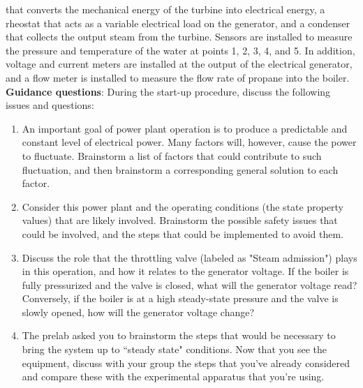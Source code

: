 \documentclass[12pt]{article}
\begin{document}
\noindent that converts the
mechanical energy of the turbine into electrical energy, a rheostat
that acts as a variable electrical load on the generator, and
a condenser that collects the output steam from the turbine.
Sensors are installed to measure the pressure and temperature
of the water at points 1, 2, 3, 4, and 5.  In addition, voltage 
and current meters are installed at the output of the electrical
generator, and a flow meter is installed to measure the 
flow rate of propane into the boiler. \\

\noindent \textbf{Guidance questions}: During the start-up procedure, discuss the following issues and questions:
\begin{enumerate}
\renewcommand{\labelenumi}{\alph{enumi}.)}
	\item An important goal of power plant operation is to produce a predictable and constant level of electrical power. Many factors will, however, cause the power to fluctuate. Brainstorm a list of factors that could contribute to such fluctuation, and then brainstorm a corresponding general solution to each factor.
	\item Consider this power plant and the operating conditions (the state property values) that are likely involved. Brainstorm the possible safety issues that could be involved, and the steps that could be implemented to avoid them.
	\item Discuss the role that the throttling valve (labeled as "Steam admission") plays in this operation, and how it relates to the generator voltage. If the boiler is fully pressurized and the valve is closed, what will the generator voltage read? Conversely, if the boiler is at a high steady-state pressure and the valve is slowly opened, how will the generator voltage change?
	\item The prelab asked you to brainstorm the steps that would be necessary to bring the system up to ``steady state" conditions. Now that you see the equipment, discuss with your group the steps that you've already considered and compare these with the experimental apparatus that you're using.
\end{enumerate}
\end{document}
